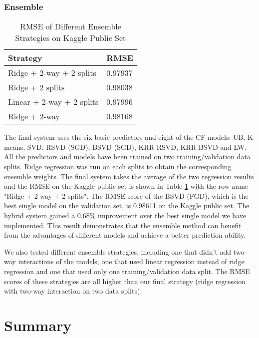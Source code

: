 \documentclass[10pt,conference,compsocconf]{IEEEtran}
\begin{document}
\subsubsection{Ensemble}
\begin{table}[htbp]
  \centering
  \begin{tabular}[c]{|l||l|}
    \hline
    Strategy&RMSE\\
    \hline
    Ridge + 2-way + 2 splits&0.97937\\
    Ridge + 2 splits&0.98038\\
    Linear + 2-way + 2 splits&0.97996\\
    Ridge + 2-way&0.98168\\
    \hline
  \end{tabular}
    \caption{  \label{ensembleTable} RMSE of Different Ensemble Strategies on Kaggle Public Set}
\end{table}

The final system uses the six basic predictors and eight of the CF models: UB, K-means, SVD, RSVD (SGD), BSVD (SGD), KRR-RSVD, KRR-BSVD and LW. All the predictors and models have been trained on two training/validation data splits. Ridge regression was run on each splits to obtain the corresponding ensemble weights. The final system takes the average of the two regression results and the RMSE on the Kaggle public set is shown in Table \ref{ensembleTable} with the row name "Ridge + 2-way + 2 splits". The RMSE score of the BSVD (FGD), which is the best single model on the validation set, is 0.98611 on the Kaggle public set. The hybrid system gained a 0.68\% improvement over the best single model we have implemented. This result demonstrates that the ensemble method can benefit from the advantages of different models and achieve a better prediction ability.

We also tested different ensemble strategies, including one that didn't add two-way interactions of the models, one that used linear regression instead of ridge regression and one that used only one training/validation data split. The RMSE scores of these strategies are all higher than our final strategy (ridge regression with two-way interaction on two data splits).

\section{Summary}
\end{document}
